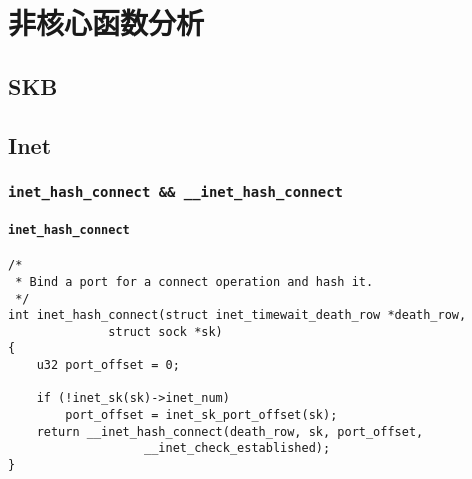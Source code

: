 \chapter{非核心函数分析}

\minitoc

\section{SKB}


\section{Inet}
	\subsection{\texttt{inet_hash_connect && __inet_hash_connect}}

		\subsubsection{\texttt{inet_hash_connect}}
\begin{verbatim}
/*
 * Bind a port for a connect operation and hash it.
 */
int inet_hash_connect(struct inet_timewait_death_row *death_row,
		      struct sock *sk)
{
	u32 port_offset = 0;

	if (!inet_sk(sk)->inet_num)
		port_offset = inet_sk_port_offset(sk);
	return __inet_hash_connect(death_row, sk, port_offset,
				   __inet_check_established);
}
\end{verbatim}

